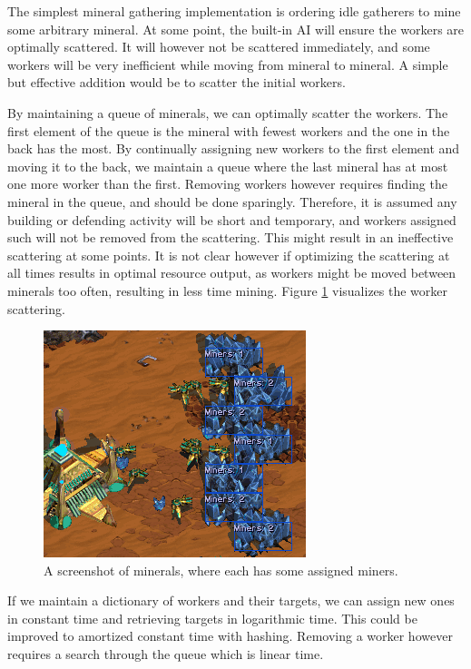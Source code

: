 The simplest mineral gathering implementation is ordering idle gatherers to mine some arbitrary mineral. At some point, the built-in AI will ensure the workers are optimally scattered. It will however not be scattered immediately, and some workers will be very inefficient while moving from mineral to mineral. A simple but effective addition would be to scatter the initial workers.

By maintaining a queue of minerals, we can optimally scatter the workers. The first element of the queue is the mineral with fewest workers and the one in the back has the most. By continually assigning new workers to the first element and moving it to the back, we maintain a queue where the last mineral has at most one more worker than the first. Removing workers however requires finding the mineral in the queue, and should be done sparingly. Therefore, it is assumed any building or defending activity will be short and temporary, and workers assigned such will not be removed from the scattering. This might result in an ineffective scattering at some points. It is not clear however if optimizing the scattering at all times results in optimal resource output, as workers might be moved between minerals too often, resulting in less time mining. Figure \ref{fig:minerals} visualizes the worker scattering.

\begin{figure}
	\centering
	\includegraphics{figures/Minerals}
	\caption{A screenshot of minerals, where each has some assigned miners.}
	\label{fig:minerals}
\end{figure}

If we maintain a dictionary of workers and their targets, we can assign new ones in constant time and retrieving targets in logarithmic time. This could be improved to amortized constant time with hashing. Removing a worker however requires a search through the queue which is linear time.

